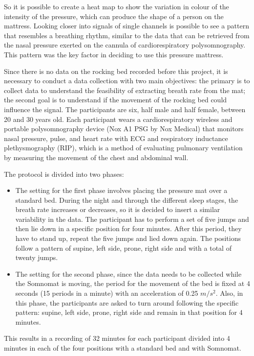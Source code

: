 So it is possible to create a heat map to show the variation in colour of the intensity of the pressure, which can produce the shape of a person on the mattress.
Looking closer into signals of single channels is possible to see a pattern that resembles a breathing rhythm, similar to the data that can be retrieved from the nasal pressure exerted on the cannula of cardiorespiratory polysomnography.
This pattern was the key factor in deciding to use this pressure mattress. 


Since there is no data on the rocking bed recorded before this project, it is necessary to conduct a data collection with two main objectives: the primary is to collect data to understand the feasibility of extracting breath rate from the mat; the second goal is to understand if the movement of the rocking bed could influence the signal.
The participants are six, half male and half female, between 20 and 30 years old.
Each participant wears a cardiorespiratory wireless and portable polysomnography device (Nox A1 PSG by Nox Medical\cite{WirelessSystem}) that monitors nasal pressure, pulse, and heart rate with ECG and respiratory inductance plethysmography (RIP), which is a method of evaluating pulmonary ventilation by measuring the movement of the chest and abdominal wall. 

The protocol is divided into two phases:
\begin{itemize}
\item The setting for the first phase involves placing the pressure mat over a standard bed. During the night and through the different sleep stages, the breath rate increases or decreases, so it is decided to insert a similar variability in the data. The participant has to perform a set of five jumps and then lie down in a specific position for four minutes. After this period, they have to stand up, repeat the five jumps and lied down again. The positions follow a pattern of supine, left side, prone, right side and with a total of twenty jumps.


\item The setting for the second phase, since the data needs to be collected while the Somnomat is moving, the period for the movement of the bed is fixed at 4 seconds (15 periods in a minute) with an acceleration of 0.25 $m/s^2$. Also, in this phase, the participants are asked to turn around following the specific pattern: supine, left side, prone, right side and remain in that position for 4 minutes.
\end{itemize}
This results in a recording of 32 minutes for each participant divided into 4 minutes in each of the four positions with a standard bed and with Somnomat.


